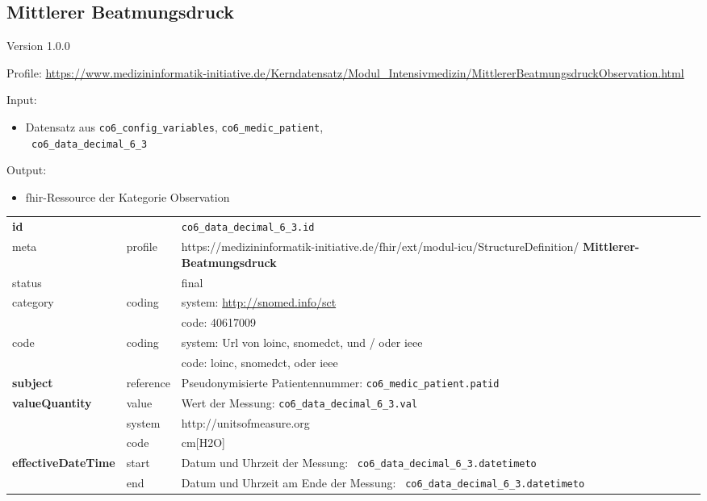 \subsection{Mittlerer Beatmungsdruck} 
\noindent Version 1.0.0

\noindent Profile: \url{https://www.medizininformatik-initiative.de/Kerndatensatz/Modul_Intensivmedizin/MittlererBeatmungsdruckObservation.html}

\noindent Input:
\begin{itemize}
	\item Datensatz aus \texttt{co6\_config\_variables}, \texttt{co6\_medic\_patient}, \\ \texttt{
co6\_data\_decimal\_6\_3}
\end{itemize}
Output:
\begin{itemize}
        \item \ac{fhir}-Ressource der Kategorie \glqq Observation\grqq{}
\end{itemize}
\begin{longtable}{|l|l|p{7.5cm}|}
        \hline
        \rowcolor{lightgray} \multicolumn{3}{|l|}{Data Mapping (inhaltlich)} \\ \hline
        \textbf{id} &  & \texttt{co6\_data\_decimal\_6\_3.id} \\ \hline
	meta & profile & https://medizininformatik-initiative.de/fhir/ext/modul-icu/StructureDefinition/\textbf{
Mittlerer-Beatmungsdruck} \\ \hline 
	status &  & final   \\ \hline 
	category & coding & system: \url{http://snomed.info/sct} \\
\cline{3-3}
	& & code: 40617009 \\ \hline
	code & coding & system: Url von \ac{loinc}, \ac{snomedct}, und / oder \ac{ieee} \\ 
	\cline{3-3} 
	 &  & code: \ac{loinc}, \ac{snomedct}, oder \ac{ieee} \\ \hline
	 \textbf{subject}  & reference & Pseudonymisierte Patientennummer: \texttt{co6\_medic\_patient.patid} \\ \hline
	 \textbf{valueQuantity}  & value & Wert der Messung: \texttt{co6\_data\_decimal\_6\_3.val} \\
        \cline{2-3}
         & system & http://unitsofmeasure.org \\
         \cline{2-3}
         & code & cm[H2O] \\ \hline
     \textbf{effectiveDateTime}  & start & Datum und Uhrzeit der Messung: \texttt{
co6\_data\_decimal\_6\_3.datetimeto} \\
    \cline{2-3}
     & end & Datum und Uhrzeit am Ende der Messung: \texttt{
co6\_data\_decimal\_6\_3.datetimeto} \\ \hline
\end{longtable}


